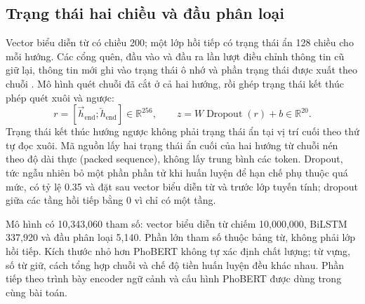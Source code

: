 \subsection{Trạng thái hai chiều và đầu phân loại}
Vector biểu diễn từ có chiều 200; một lớp hồi tiếp có trạng thái ẩn 128 chiều cho mỗi hướng. Các cổng quên, đầu vào và đầu ra lần lượt điều chỉnh thông tin cũ giữ lại, thông tin mới ghi vào trạng thái ô nhớ và phần trạng thái được xuất theo chuỗi \citep{kowsari2019}. Mô hình quét chuỗi đã cắt ở cả hai hướng, rồi ghép trạng thái kết thúc phép quét xuôi và ngược:
\begin{equation}
r=[\overrightarrow h_{\mathrm{end}};\overleftarrow h_{\mathrm{end}}]\in\mathbb R^{256},\qquad
z=W\operatorname{Dropout}(r)+b\in\mathbb R^{20}.
\end{equation}
Trạng thái kết thúc hướng ngược không phải trạng thái ẩn tại vị trí cuối theo thứ tự đọc xuôi. Mã nguồn lấy hai trạng thái ẩn cuối của hai hướng từ chuỗi nén theo độ dài thực (packed sequence), không lấy trung bình các token. Dropout, tức ngẫu nhiên bỏ một phần phần tử khi huấn luyện để hạn chế phụ thuộc quá mức, có tỷ lệ 0.35 và đặt sau vector biểu diễn từ và trước lớp tuyến tính; dropout giữa các tầng hồi tiếp bằng 0 vì chỉ có một tầng.

\BiLSTMDiagram

Mô hình có 10,343,060 tham số: vector biểu diễn từ chiếm 10,000,000, BiLSTM 337,920 và đầu phân loại 5,140. Phần lớn tham số thuộc bảng từ, không phải lớp hồi tiếp. Kích thước nhỏ hơn PhoBERT không tự xác định chất lượng; từ vựng, số từ giữ, cách tổng hợp chuỗi và chế độ tiền huấn luyện đều khác nhau. Phần tiếp theo trình bày encoder ngữ cảnh và cấu hình PhoBERT được dùng trong cùng bài toán.
